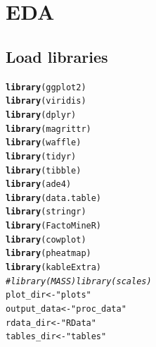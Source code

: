 \documentclass{article}\usepackage[]{graphicx}\usepackage[]{color}
\makeatletter
\newcommand{\hlstr}[1]{\textcolor[rgb]{0.192,0.494,0.8}{#1}}%
\newcommand{\hlcom}[1]{\textcolor[rgb]{0.678,0.584,0.686}{\textit{#1}}}%
\newcommand{\hlstd}[1]{\textcolor[rgb]{0.345,0.345,0.345}{#1}}%
\newcommand{\hlkwb}[1]{\textcolor[rgb]{0.69,0.353,0.396}{#1}}%
\newcommand{\hlkwd}[1]{\textcolor[rgb]{0.737,0.353,0.396}{\textbf{#1}}}%
\newenvironment{kframe}{%
 \def\at@end@of@kframe{}%
 \ifinner\ifhmode%
  \def\at@end@of@kframe{\end{minipage}}%
  \begin{minipage}{\columnwidth}%
 \fi\fi%
 \def\FrameCommand##1{\hskip\@totalleftmargin \hskip-\fboxsep
 \colorbox{shadecolor}{##1}\hskip-\fboxsep
     \hskip-\linewidth \hskip-\@totalleftmargin \hskip\columnwidth}%
 \MakeFramed {\advance\hsize-\width
   \@totalleftmargin\z@ \linewidth\hsize
   \@setminipage}}%
 {\par\unskip\endMakeFramed%
 \at@end@of@kframe}
\newenvironment{knitrout}{}{} %
\makeatother
\begin{document}
\section{EDA}

\subsection{Load libraries}
\begin{knitrout}
\color{fgcolor}\begin{kframe}
\begin{alltt}
\hlkwd{library}\hlstd{(ggplot2)}
\hlkwd{library}\hlstd{(viridis)}
\hlkwd{library}\hlstd{(dplyr)}
\hlkwd{library}\hlstd{(magrittr)}
\hlkwd{library}\hlstd{(waffle)}
\hlkwd{library}\hlstd{(tidyr)}
\hlkwd{library}\hlstd{(tibble)}
\hlkwd{library}\hlstd{(ade4)}
\hlkwd{library}\hlstd{(data.table)}
\hlkwd{library}\hlstd{(stringr)}
\hlkwd{library}\hlstd{(FactoMineR)}
\hlkwd{library}\hlstd{(cowplot)}
\hlkwd{library}\hlstd{(pheatmap)}
\hlkwd{library}\hlstd{(kableExtra)}
\hlcom{# library(MASS) library(scales)}
\hlstd{plot_dir} \hlkwb{<-} \hlstr{"plots"}
\hlstd{output_data} \hlkwb{<-} \hlstr{"proc_data"}
\hlstd{rdata_dir} \hlkwb{<-} \hlstr{"RData"}
\hlstd{tables_dir} \hlkwb{<-} \hlstr{"tables"}
\end{alltt}
\end{kframe}
\end{knitrout}
\end{document}
